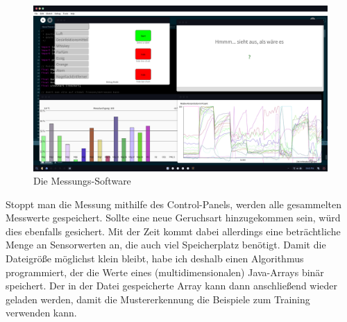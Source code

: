 \documentclass[10pt]{article}
\begin{document}
\begin{figure}[H]
\centering
\includegraphics[scale=0.25]{Bilder/MessungsSoftware.png}
\caption{Die Messungs-Software}
\label{Messungs-Software}
\end{figure}

Stoppt man die Messung mithilfe des Control-Panels, werden alle gesammelten Messwerte gespeichert. Sollte eine neue Geruchsart hinzugekommen sein, würd dies ebenfalls gesichert. 
Mit der Zeit kommt dabei allerdings eine beträchtliche Menge an Sensorwerten an, die auch viel Speicherplatz benötigt. Damit die Dateigröße möglichst klein bleibt,
habe ich deshalb einen Algorithmus programmiert, der die Werte eines (multidimensionalen) Java-Arrays binär speichert. Der in der Datei gespeicherte Array kann dann
anschließend wieder geladen werden, damit die Mustererkennung die Beispiele zum Training verwenden kann.
\end{document}
